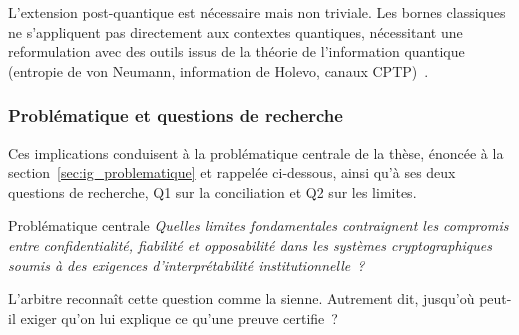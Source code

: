 \begin{sloppypar}
L'extension post-quantique est n\'ecessaire mais non triviale. Les bornes
classiques ne s'appliquent pas directement aux contextes quantiques,
n\'ecessitant une reformulation avec des outils issus de la th\'eorie de l'information
quantique (entropie de von Neumann, information de Holevo, canaux CPTP)~\cite{NielsenChuang2010,Wilde2017,Hiai1991}.

\subsubsection{Probl\'ematique et questions de recherche}
\label{subsubsec:formulation_problematique}

Ces implications conduisent \`a la probl\'ematique centrale de la th\`ese, \'enonc\'ee \`a la
section~\ref{sec:ig_problematique} et rappel\'ee ci-dessous, ainsi qu'\`a ses deux questions de
recherche, Q1 sur la conciliation et Q2 sur les limites.

\begin{boiteProblematique}{Probl\'ematique centrale}
\textit{Quelles limites fondamentales contraignent les compromis entre confidentialit\'e, fiabilit\'e et opposabilit\'e dans les syst\`emes cryptographiques soumis \`a des exigences d'interpr\'etabilit\'e institutionnelle~?}
\end{boiteProblematique}
\end{sloppypar}

\begin{boiteArbitre}
L'arbitre reconna\^it cette question comme la sienne.
Autrement dit, jusqu'o\`u peut-il exiger qu'on lui
explique ce qu'une preuve certifie~?
\end{boiteArbitre}


